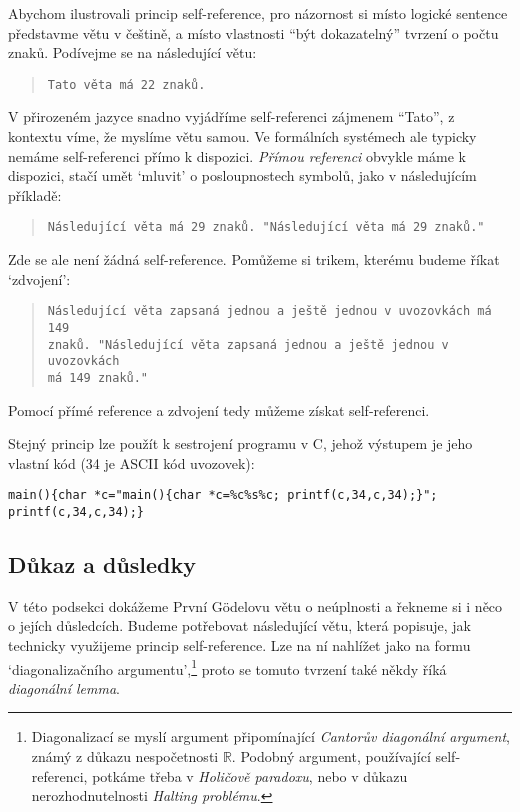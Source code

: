 Abychom ilustrovali princip self-reference, pro názornost si místo logické sentence představme větu v češtině, a místo vlastnosti ``být dokazatelný'' tvrzení o počtu znaků. Podívejme se na následující větu:
\begin{quote}
    \texttt{Tato věta má 22 znaků.}
\end{quote}
V přirozeném jazyce snadno vyjádříme self-referenci zájmenem ``Tato'', z kontextu víme, že myslíme větu samou. Ve formálních systémech ale typicky nemáme self-referenci přímo k dispozici. \emph{Přímou referenci} obvykle máme k dispozici, stačí umět `mluvit' o posloupnostech symbolů, jako v následujícím příkladě:
\begin{quote}
    \texttt{Následující věta má 29 znaků. "Následující věta má 29 znaků."}
\end{quote}
Zde se ale není žádná self-reference. Pomůžeme si trikem, kterému budeme říkat `zdvojení':
\begin{quote}
    \texttt{Následující věta zapsaná jednou a ještě jednou v uvozovkách má 149\\ znaků. "Následující věta zapsaná jednou a ještě jednou v uvozovkách\\ má 149 znaků."}
\end{quote}
Pomocí přímé reference a zdvojení tedy můžeme získat self-referenci.\begin{remark}
    Stejný princip lze použít k sestrojení programu v C, jehož výstupem je jeho vlastní kód (34 je ASCII kód uvozovek):    
{\small
\begin{verbatim}
main(){char *c="main(){char *c=%c%s%c; printf(c,34,c,34);}"; printf(c,34,c,34);}    
\end{verbatim}
}
\end{remark}


\subsection{Důkaz a důsledky}

V této podsekci dokážeme První Gödelovu větu o neúplnosti a řekneme si i něco o jejích důsledcích. Budeme potřebovat následující větu, která popisuje, jak technicky využijeme princip self-reference. Lze na ní nahlížet jako na formu `diagonalizačního argumentu',\footnote{Diagonalizací se myslí argument připomínající \emph{Cantorův diagonální argument}, známý z důkazu nespočetnosti $\mathbb R$. Podobný argument, používající self-referenci, potkáme třeba v \emph{Holičově paradoxu}, nebo v důkazu nerozhodnutelnosti \emph{Halting problému}.} proto se tomuto tvrzení také někdy říká \emph{diagonální lemma}.

